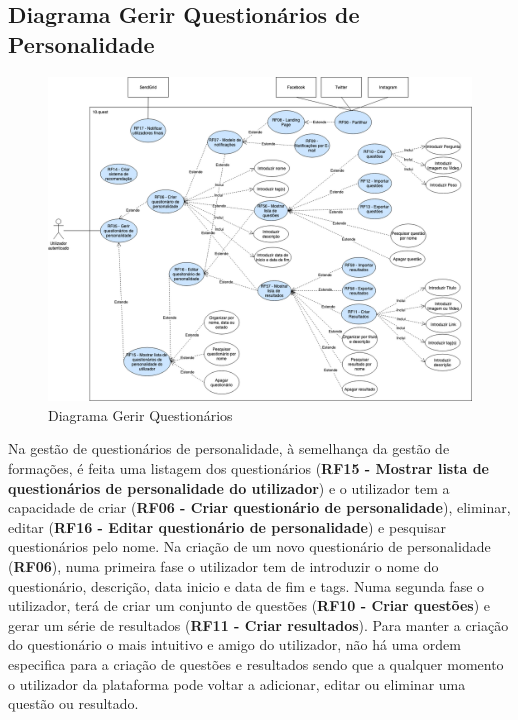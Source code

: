 \subsection{Diagrama Gerir Questionários de Personalidade}
\label{d:quests}
\begin{figure}[ht!]
	\begin{center}
		\includegraphics[width=1\textwidth]{img/rf/gerir-quest}
		\caption{Diagrama Gerir Questionários}
		\label{fig:rf-gerir-quest}
	\end{center}
\end{figure}

Na gestão de questionários de personalidade, à semelhança da gestão de formações, é feita uma listagem dos questionários (\textbf{RF15 - Mostrar lista de questionários de personalidade do utilizador}) e o utilizador tem a capacidade de criar (\textbf{RF06 - Criar questionário de personalidade}), eliminar, editar (\textbf{RF16 - Editar questionário de personalidade}) e pesquisar questionários pelo nome.
Na criação de um novo questionário de personalidade (\textbf{RF06}), numa primeira fase o utilizador tem de introduzir o nome do questionário, descrição, data inicio e data de fim e tags. Numa segunda fase o utilizador, terá de criar um conjunto de questões (\textbf{RF10 - Criar questões}) e gerar um série de resultados (\textbf{RF11 - Criar resultados}). Para manter a criação do questionário o mais intuitivo e amigo do utilizador, não há uma ordem especifica para a criação de questões e resultados sendo que a qualquer momento o utilizador da plataforma pode voltar a adicionar, editar ou eliminar uma questão ou resultado. 

